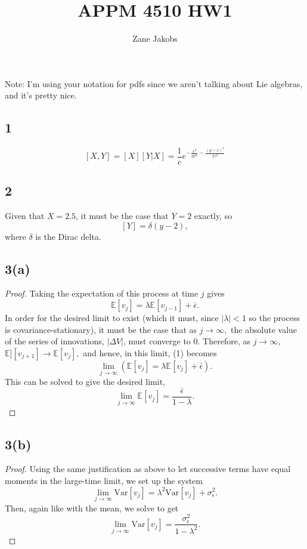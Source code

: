 \documentclass[11pt]{article}
\begin{document}
\title{APPM 4510 HW1}
\author{Zane Jakobs}
\date{}
\maketitle
Note: I'm using your notation for pdfs since we aren't talking about Lie algebras, and it's pretty nice.\\
\subsection*{1} 
$$ [X,Y] = [X] [Y | X] = \dfrac{1}{c} e^{-\frac{x^2}{2\sigma^2} - \frac{(y-x)^2}{2\gamma^2}}$$

\subsection*{2} Given that $X = 2.5$, it must be the case that $Y = 2$ exactly, so
$$[Y] = \delta(y - 2),$$ 
where $\delta$ is the Dirac delta.
\subsection*{3(a)}
\begin{proof}
Taking the expectation of this process at time $j$ gives
\[ \mathbb{E}[v_{j}] = \lambda \mathbb{E}[v_{j-1}] + \bar{\epsilon}\tag{1}.\]
In order for the desired limit to exist (which it must, since $|\lambda | < 1$ so the process is covariance-stationary), it must be the case that as $j\to\infty,$ the absolute value of the series of innovations, $|\Delta V|$, must converge to $0$. Therefore, as $j\to\infty,$ $\mathbb{E}][v_{j+1}] \to \mathbb{E}[v_{j}],$ and hence, in this limit, (1) becomes
\[ 
\lim\limits_{j\to\infty}\left(\mathbb{E}[v_{j}] = \lambda \mathbb{E}[v_{j}] + \bar{\epsilon} \right)\tag{2}.
\]
This can be solved to give the desired limit,
\[
\lim\limits_{j\to\infty}\mathbb{E}[v_{j}] = \dfrac{\bar{\epsilon}}{1-\lambda}.\tag*{\qedhere}
\] 
\end{proof}
\subsection*{3(b)} 
\begin{proof}
Using the same justification as above to let successive terms have equal moments in the large-time limit, we set up the system
\[
\lim\limits_{j\to\infty} \mathrm{Var}[v_{j}] = \lambda^2\mathrm{Var}[v_{j}] + \sigma_{\epsilon}^2 \tag{3}.
\]
Then, again like with the mean, we solve to get
\[
\lim\limits_{j\to\infty} \mathrm{Var}[v_{j}] = \dfrac{\sigma_{\epsilon}^2}{1-\lambda^2}.\tag*{\qedhere}
\]
\end{proof}
\end{document}
